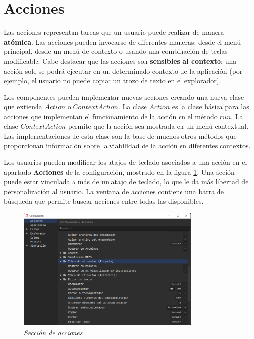 \section{Acciones}\label{sec:acciones}

Las acciones representan tareas que un usuario puede realizar de manera
\textbf{atómica}.
Las acciones pueden invocarse de diferentes maneras:
desde el menú principal, desde un menú de contexto
o usando una combinación de teclas modificable.
Cabe destacar que las acciones son \textbf{sensibles al contexto}:
una acción solo se podrá ejecutar en un determinado contexto
de la aplicación (por ejemplo, el usuario no puede copiar un trozo de texto
en el explorador).

Los componentes pueden implementar nuevas acciones
creando una nueva clase que extienda $Action$ o $ContextAction$.
La clase $Action$ es la clase básica para las acciones que implementan el funcionamiento
de la acción en el método $run$.
La clase $ContextAction$ permite que la acción sea
mostrada en un menú contextual.
Las implementaciones de esta clase son la base de
muchos otros métodos que proporcionan información
sobre la viabilidad de la acción en diferentes contextos.

Los usuarios pueden modificar los atajos de teclado
asociados a una acción en el apartado \textbf{Acciones} de la
configuración, mostrado en la figura \ref{fig:jams-configuracion-acciones}.
Una acción puede estar vinculada a más de un atajo de teclado,
lo que le da más libertad de personalización al usuario.
La ventana de acciones contiene una barra de búsqueda que
permite buscar acciones entre todas las disponibles.

\begin{figure}[H]
    \centering
    \includegraphics[width=0.8\textwidth]{images/base/jams-config-actions}
    \caption{\textit{Sección de acciones}}
    \label{fig:jams-configuracion-acciones}
\end{figure}


